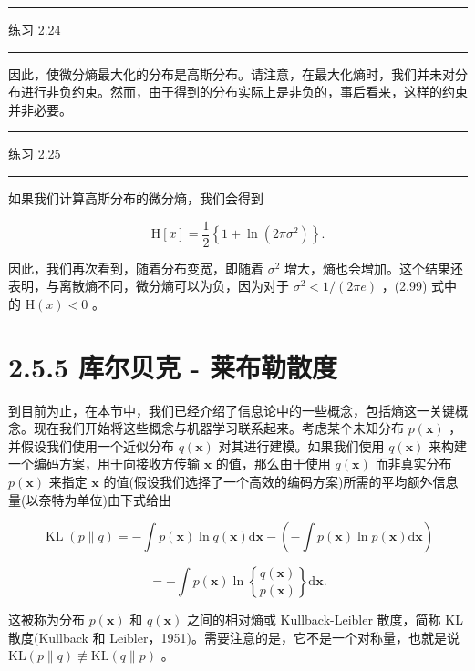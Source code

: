 \documentclass[10pt]{report}
\newcommand{\HRule}{\begin{center}\rule{0.9\linewidth}{0.2mm}\end{center}}
\begin{document}
\HRule

练习 2.24

\HRule

因此，使微分熵最大化的分布是高斯分布。请注意，在最大化熵时，我们并未对分布进行非负约束。然而，由于得到的分布实际上是非负的，事后看来，这样的约束并非必要。

\HRule

练习 2.25

\HRule

如果我们计算高斯分布的微分熵，我们会得到

\[
\mathrm{H}\left\lbrack  x\right\rbrack   = \frac{1}{2}\left\{  {1 + \ln \left( {{2\pi }{\sigma }^{2}}\right) }\right\}  . \tag{2.99}
\]

因此，我们再次看到，随着分布变宽，即随着 \({\sigma }^{2}\) 增大，熵也会增加。这个结果还表明，与离散熵不同，微分熵可以为负，因为对于 \({\sigma }^{2} < 1/\left( {2\pi e}\right)\) ，(2.99) 式中的 \(\mathrm{H}\left( x\right)  < 0\) 。

\section*{2.5.5 库尔贝克 - 莱布勒散度}

到目前为止，在本节中，我们已经介绍了信息论中的一些概念，包括熵这一关键概念。现在我们开始将这些概念与机器学习联系起来。考虑某个未知分布 \(p\left( \mathbf{x}\right)\) ，并假设我们使用一个近似分布 \(q\left( \mathbf{x}\right)\) 对其进行建模。如果我们使用 \(q\left( \mathbf{x}\right)\) 来构建一个编码方案，用于向接收方传输 \(\mathbf{x}\) 的值，那么由于使用 \(q\left( \mathbf{x}\right)\) 而非真实分布 \(p\left( \mathbf{x}\right)\) 来指定 \(\mathbf{x}\) 的值(假设我们选择了一个高效的编码方案)所需的平均额外信息量(以奈特为单位)由下式给出

\[
\operatorname{KL}\left( {p\parallel q}\right)  =  - \int p\left( \mathbf{x}\right) \ln q\left( \mathbf{x}\right) \mathrm{d}\mathbf{x} - \left( {-\int p\left( \mathbf{x}\right) \ln p\left( \mathbf{x}\right) \mathrm{d}\mathbf{x}}\right)
\]

\[
=  - \int p\left( \mathbf{x}\right) \ln \left\{  \frac{q\left( \mathbf{x}\right) }{p\left( \mathbf{x}\right) }\right\}  \mathrm{d}\mathbf{x}. \tag{2.100}
\]

这被称为分布 \(p\left( \mathbf{x}\right)\) 和 \(q\left( \mathbf{x}\right)\) 之间的相对熵或 Kullback-Leibler 散度，简称 KL 散度(Kullback 和 Leibler，1951)。需要注意的是，它不是一个对称量，也就是说 \(\mathrm{{KL}}\left( {p\parallel q}\right)  ≢ \mathrm{{KL}}\left( {q\parallel p}\right)\) 。
\end{document}

